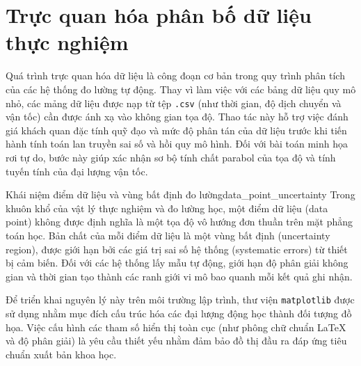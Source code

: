 \section{Trực quan hóa phân bố dữ liệu thực nghiệm}
\label{sec:truc_quan_hoa_du_lieu}

Quá trình trực quan hóa dữ liệu là công đoạn cơ bản trong quy trình phân tích của các hệ thống đo lường tự động. Thay vì làm việc với các bảng dữ liệu quy mô nhỏ, các mảng dữ liệu được nạp từ tệp \texttt{.csv} (như thời gian, độ dịch chuyển và vận tốc) cần được ánh xạ vào không gian tọa độ. Thao tác này hỗ trợ việc đánh giá khách quan đặc tính quỹ đạo và mức độ phân tán của dữ liệu trước khi tiến hành tính toán lan truyền sai số và hồi quy mô hình. Đối với bài toán minh họa rơi tự do, bước này giúp xác nhận sơ bộ tính chất parabol của tọa độ và tính tuyến tính của đại lượng vận tốc.

\begin{physcore}{Khái niệm điểm dữ liệu và vùng bất định đo lường}{data_point_uncertainty}
Trong khuôn khổ của vật lý thực nghiệm và đo lường học, một điểm dữ liệu (data point) không được định nghĩa là một tọa độ vô hướng đơn thuần trên mặt phẳng toán học. Bản chất của mỗi điểm dữ liệu là một vùng bất định (uncertainty region), được giới hạn bởi các giá trị sai số hệ thống (systematic errors) từ thiết bị cảm biến. Đối với các hệ thống lấy mẫu tự động, giới hạn độ phân giải không gian và thời gian tạo thành các ranh giới vi mô bao quanh mỗi kết quả ghi nhận.
\end{physcore}

Để triển khai nguyên lý này trên môi trường lập trình, thư viện \texttt{matplotlib} được sử dụng nhằm mục đích cấu trúc hóa các đại lượng động học thành đối tượng đồ họa. Việc cấu hình các tham số hiển thị toàn cục (như phông chữ chuẩn LaTeX và độ phân giải) là yêu cầu thiết yếu nhằm đảm bảo đồ thị đầu ra đáp ứng tiêu chuẩn xuất bản khoa học.

